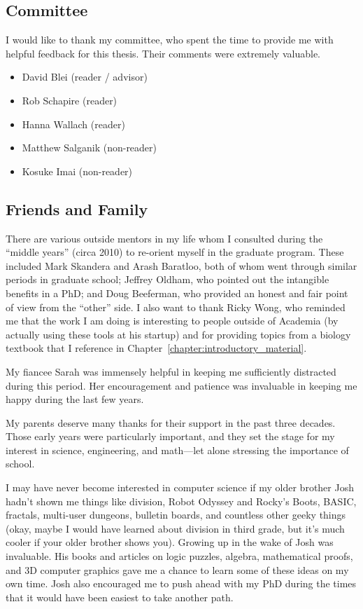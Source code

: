 \subsection*{Committee}
I would like to thank my committee, who spent the time to provide me
with helpful feedback for this thesis.  Their comments were extremely valuable.
\begin{itemize}
  \item David Blei (reader / advisor)
  \item Rob Schapire (reader)
  \item Hanna Wallach (reader)
  \item Matthew Salganik (non-reader)
  \item Kosuke Imai (non-reader)
\end{itemize}

\subsection*{Friends and Family}

There are various outside mentors in my life whom I consulted during
the ``middle years'' (circa 2010) to re-orient myself in the graduate
program. These included Mark Skandera and Arash Baratloo, both of whom
went through similar periods in graduate school; Jeffrey Oldham, who
pointed out the intangible benefits in a PhD; and Doug Beeferman, who
provided an honest and fair point of view from the ``other'' side.  I
also want to thank Ricky Wong, who reminded me that the work I am
doing is interesting to people outside of Academia (by actually using
these tools at his startup) and for providing topics from a biology
textbook that I reference in
Chapter~\ref{chapter:introductory_material}.

My fiancee Sarah was immensely helpful in keeping me sufficiently
distracted during this period.  Her encouragement and patience was
invaluable in keeping me happy during the last few years.

My parents deserve many thanks for their support in the past three
decades.  Those early years were particularly important, and they set
the stage for my interest in science, engineering, and math---let
alone stressing the importance of school.

I may have never become interested in computer science if my older
brother Josh hadn't shown me things like division, Robot Odyssey and
Rocky's Boots, BASIC, fractals, multi-user dungeons, bulletin boards,
and countless other geeky things (okay, maybe I would have learned
about division in third grade, but it's much cooler if your older
brother shows you).  Growing up in the wake of Josh was invaluable.
His books and articles on logic puzzles, algebra, mathematical proofs,
and 3D computer graphics gave me a chance to learn some of these ideas
on my own time.  Josh also encouraged me to push ahead with my PhD
during the times that it would have been easiest to take another path.

